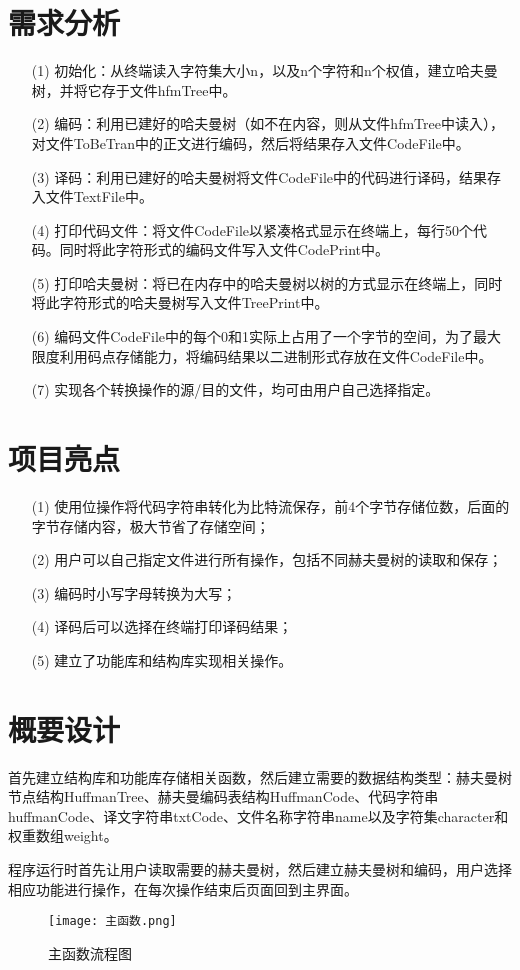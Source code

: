 \documentclass{DateStructure}
\begin{document}
\makecover
\newpage
\thispagestyle{empty}
\tableofcontents   
\newpage
\setcounter{page}{1}  

\section{需求分析}
\begin{itemize}
\item[(1)]初始化：从终端读入字符集大小n，以及n个字符和n个权值，建立哈夫曼树，并将它存于文件hfmTree中。
\item[(2)]编码：利用已建好的哈夫曼树（如不在内容，则从文件hfmTree中读入），对文件ToBeTran中的正文进行编码，然后将结果存入文件CodeFile中。
\item[(3)]译码：利用已建好的哈夫曼树将文件CodeFile中的代码进行译码，结果存入文件TextFile中。
\item[(4)]打印代码文件：将文件CodeFile以紧凑格式显示在终端上，每行50个代码。同时将此字符形式的编码文件写入文件CodePrint中。
\item[(5)]打印哈夫曼树：将已在内存中的哈夫曼树以树的方式显示在终端上，同时将此字符形式的哈夫曼树写入文件TreePrint中。
\item[(6)]编码文件CodeFile中的每个0和1实际上占用了一个字节的空间，为了最大限度利用码点存储能力，将编码结果以二进制形式存放在文件CodeFile中。
\item[(7)]实现各个转换操作的源/目的文件，均可由用户自己选择指定。
\end{itemize}

\section{项目亮点}
\begin{itemize}
\item[(1)]使用位操作将代码字符串转化为比特流保存，前4个字节存储位数，后面的字节存储内容，极大节省了存储空间；
\item[(2)]用户可以自己指定文件进行所有操作，包括不同赫夫曼树的读取和保存；
\item[(3)]编码时小写字母转换为大写；
\item[(4)]译码后可以选择在终端打印译码结果；
\item[(5)]建立了功能库和结构库实现相关操作。
\end{itemize}
\section{概要设计}
首先建立结构库和功能库存储相关函数，然后建立需要的数据结构类型：赫夫曼树节点结构HuffmanTree、赫夫曼编码表结构HuffmanCode、代码字符串huffmanCode、译文字符串txtCode、文件名称字符串name以及字符集character和权重数组weight。\par
程序运行时首先让用户读取需要的赫夫曼树，然后建立赫夫曼树和编码，用户选择相应功能进行操作，在每次操作结束后页面回到主界面。
\begin{figure}[H] 
\centering
\texttt{[image: 主函数.png]}
\caption{主函数流程图}
\end{figure}
\end{document}
